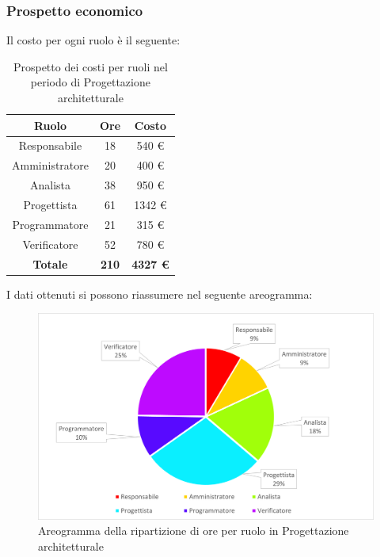 \subsubsection{Prospetto economico}
Il costo per ogni ruolo è il seguente:
\begin{table}[H]
		\begin{center}
			\setlength{\aboverulesep}{0pt}
			\setlength{\belowrulesep}{0pt}
			\setlength{\extrarowheight}{.75ex}
			\begin{tabular}{ c c c }
				\rowcolor{AzzurroGruppo!30} 
				\textbf{Ruolo} & \textbf{Ore} & \textbf{Costo} \\
				\toprule
				Responsabile   & 18 & 540 \euro \\
				Amministratore & 20 & 400 \euro \\
				Analista       & 38 & 950 \euro \\
				Progettista    & 61 & 1342 \euro \\
				Programmatore  & 21 & 315 \euro \\
				Verificatore   & 52 & 780 \euro \\
				\textbf{Totale} & \textbf{210} & \textbf{4327 \euro} \\
				\bottomrule
			\end{tabular}
			\caption{ Prospetto dei costi per ruoli nel periodo di Progettazione architetturale}
		\end{center}
	\end{table}
I dati ottenuti si possono riassumere nel seguente areogramma:
\begin{figure}[H]
    \centering
    \includegraphics[scale = 0.5]{components/img/Architettura-torta.png}
    \caption{ Areogramma della ripartizione di ore per ruolo in Progettazione architetturale}
    \label{fig:Areogramma ripartizione ore, fase di Progettazione architetturale}
\end{figure}
